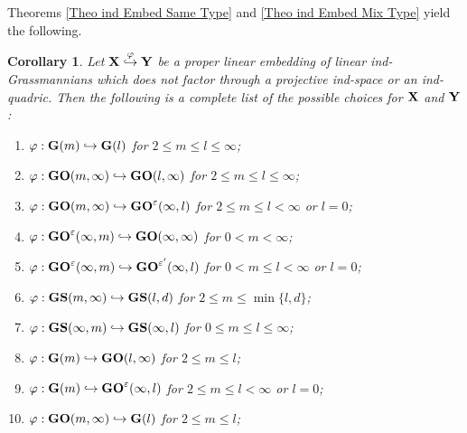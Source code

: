 \documentclass[12pt]{amsart}
\def\eps {\varepsilon}
\def\hw  {\hookrightarrow}
\newtheorem{coro}[theorem]{Corollary}
\begin{document}
Theorems \ref{Theo ind Embed Same Type} and \ref{Theo ind Embed Mix Type} yield the following.

\begin{coro}
Let ${\bf X}\stackrel{\varphi}{\hw}{\bf Y}$ be a proper linear embedding of linear ind-Grassmannians which does not factor through a projective ind-space or an ind-quadric. Then the following is a complete list of the possible choices for ${\bf X}$ and ${\bf Y}$:
\begin{enumerate}
\item[$\bullet$] $\varphi:{\bf G}(m)\hw {\bf G}(l)$ for $2\leq m\leq l\leq \infty$;\\

\item[$\bullet$] $\varphi:{\bf GO}(m,\infty)\hw {\bf GO}(l,\infty)$ for $2\leq m\leq l\leq \infty$;\\

\item[$\bullet$] $\varphi:{\bf GO}(m,\infty)\hw {\bf GO}^\eps(\infty,l)$ for $2\leq m\leq l< \infty$ or $l=0$;\\

\item[$\bullet$] $\varphi:{\bf GO}^\eps(\infty,m)\hw {\bf GO}(\infty,\infty)$ for $0<m<\infty$;\\

\item[$\bullet$] $\varphi:{\bf GO}^\eps(\infty,m)\hw {\bf GO}^{\eps'}(\infty,l)$ for $0< m\leq l<\infty$ or $l=0$;\\

\item[$\bullet$] $\varphi:{\bf GS}(m,\infty)\hw {\bf GS}(l,d)$ for $2\leq m\leq \min\{l,d\}$;\\

\item[$\bullet$] $\varphi:{\bf GS}(\infty,m)\hw {\bf GS}(\infty,l)$ for $0\leq m\leq l\leq \infty$;\\

\item[$\bullet$] $\varphi:{\bf G}(m)\hw {\bf GO}(l,\infty)$ for $2\leq m\leq l$;\\

\item[$\bullet$] $\varphi:{\bf G}(m)\hw {\bf GO}^\varepsilon(\infty,l)$ for $2\leq m \leq l<\infty$ or $l=0$;\\

\item[$\bullet$] $\varphi:{\bf GO}(m,\infty)\hookrightarrow {\bf G}(l)$ for $2\leq m\leq l$;\\


\end{enumerate}
\end{coro}
\end{document}

